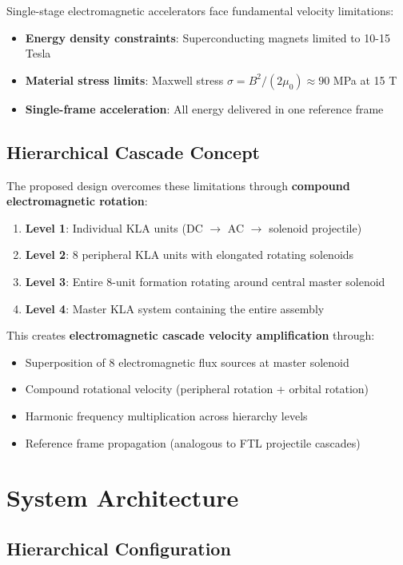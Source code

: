 \documentclass[12pt,a4paper]{article}
\begin{document}
Single-stage electromagnetic accelerators face fundamental velocity limitations:
\begin{itemize}
\item \textbf{Energy density constraints}: Superconducting magnets limited to 10-15 Tesla
\item \textbf{Material stress limits}: Maxwell stress $\sigma = B^2/(2\mu_0) \approx 90$ MPa at 15 T
\item \textbf{Single-frame acceleration}: All energy delivered in one reference frame
\end{itemize}

\subsection{Hierarchical Cascade Concept}

The proposed design overcomes these limitations through \textbf{compound electromagnetic rotation}:

\begin{enumerate}
\item \textbf{Level 1}: Individual KLA units (DC $\to$ AC $\to$ solenoid projectile)
\item \textbf{Level 2}: 8 peripheral KLA units with elongated rotating solenoids
\item \textbf{Level 3}: Entire 8-unit formation rotating around central master solenoid
\item \textbf{Level 4}: Master KLA system containing the entire assembly
\end{enumerate}

This creates \textbf{electromagnetic cascade velocity amplification} through:
\begin{itemize}
\item Superposition of 8 electromagnetic flux sources at master solenoid
\item Compound rotational velocity (peripheral rotation + orbital rotation)
\item Harmonic frequency multiplication across hierarchy levels
\item Reference frame propagation (analogous to FTL projectile cascades)
\end{itemize}

\section{System Architecture}

\subsection{Hierarchical Configuration}
\end{document}

